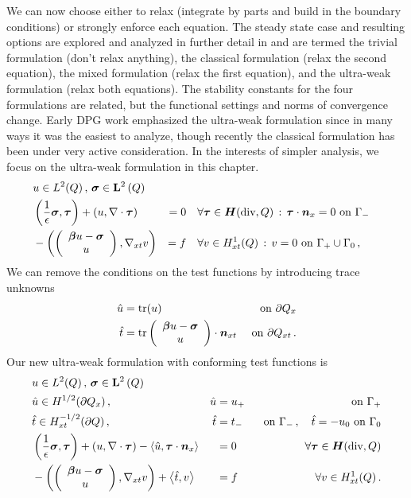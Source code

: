 \documentclass[Dissertation.tex]{subfiles}
\begin{document}
We can now choose either to relax (integrate by parts and build in the boundary conditions) or strongly enforce each equation. 
The steady state case and resulting options are explored and analyzed in further detail in \cite{VariousVariational} 
and are termed the trivial formulation (don't relax anything), the classical formulation (relax the second equation), 
the mixed formulation (relax the first equation), and the ultra-weak formulation (relax both equations).
The stability constants for the four formulations are related, but the functional settings and norms of convergence change.
Early DPG work emphasized the ultra-weak formulation since in many ways it was the easiest to analyze, 
though recently the classical formulation has been under very active consideration.
In the interests of simpler analysis, we focus on the ultra-weak formulation in this chapter.
\begin{equation}
\label{eq:confusionUltraWeakBF}
	\begin{aligned}
		&u\in L^2(Q)\,,\,\boldsymbol\sigma\in\mathbf{L}^2\left( Q \right)\\
		&\left( \frac{1}{\epsilon}\boldsymbol\sigma,\boldsymbol\tau \right)+\left( u,\nabla\cdot\boldsymbol\tau \right)&=0\quad&\forall\boldsymbol\tau\in\mbox{\boldmath $H$}(\text{div},Q)\,:\,\boldsymbol\tau\cdot\boldsymbol n_x=0\text{ on }\Gamma_-\\
		&-\left( \left( \begin{array}{c} \boldsymbol\beta u-\boldsymbol\sigma\\ u\\ \end{array} \right),\nabla_{xt} v \right)&=f\quad&\forall v\in H^1_{xt}(Q)\,:\,v=0\text{ on }\Gamma_+\cup\Gamma_0\,,
	\end{aligned}
\end{equation}
We can remove the conditions on the test functions by introducing trace unknowns 
\begin{align*}
\hat u&=\operatorname*{tr}(u)&\text{ on }\partial Q_x\\
\hat t&=\operatorname*{tr}\left( \begin{array}{c} \boldsymbol\beta u-\boldsymbol\sigma\\ u\\ \end{array} \right)\cdot\boldsymbol n_{xt}&\text{ on }\partial Q_{xt}\,.
\end{align*}
Our new ultra-weak formulation with conforming test functions is
\begin{equation}
\label{eq:confusionUltraWeakContinuousBF}
	\begin{aligned}
		&u\in L^2(Q)\,,\,\boldsymbol\sigma\in\mathbf{L}^2\left( Q \right)\\
		&\hat u\in H^{1/2}(\partial Q_x)\,,\,&\hat u&=u_+&\text{ on }\Gamma_+\\
		&\hat t\in H^{-1/2}_{xt}(\partial Q)\,,\,&\hat t&=t_-&\text{ on }\Gamma_-\,,\quad\hat t=-u_0\text{ on }\Gamma_0\\
		&\left( \frac{1}{\epsilon}\boldsymbol\sigma,\boldsymbol\tau \right)+\left( u,\nabla\cdot\boldsymbol\tau \right)-\left\langle \hat u,\boldsymbol\tau\cdot\boldsymbol n_x \right\rangle&&=0\quad&\forall\boldsymbol\tau\in\mbox{\boldmath $H$}(\text{div},Q)\\
		&-\left( \left( \begin{array}{c} \boldsymbol\beta u-\boldsymbol\sigma\\ u\\ \end{array} \right),\nabla_{xt} v \right)+\left\langle \hat t,v \right\rangle&&=f\quad&\forall v\in H^1_{xt}(Q)\,.
	\end{aligned}
\end{equation}
\end{document}
